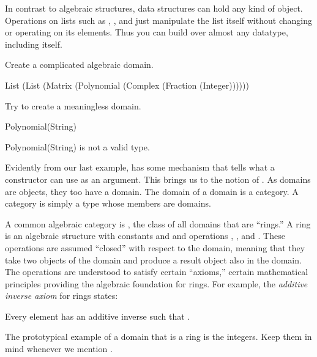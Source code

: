 In contrast to algebraic structures, data structures can hold any
kind of object.
Operations on lists such as ,
, and  just
manipulate the list itself without changing or operating on its
elements.
Thus you can build  over almost any datatype,
including itself.
\begin{xtc}
\begin{xtccomment}
Create a complicated algebraic domain.
\end{xtccomment}
\begin{spadsrc}
List (List (Matrix (Polynomial (Complex (Fraction (Integer))))))
\end{spadsrc}
\begin{TeXOutput}
\begin{fricasmath}{3}
%
\end{fricasmath}
\end{TeXOutput}
\end{xtc}
\begin{xtc}
\begin{xtccomment}
Try to create a meaningless domain.
\end{xtccomment}
\begin{spadsrc}
Polynomial(String)
\end{spadsrc}
\begin{MessageOutput}
   Polynomial(String) is not a valid type.
\end{MessageOutput}
\end{xtc}
Evidently from our last example, \Language{} has some mechanism
that tells what a constructor can use as an argument.
This brings us to the notion of .
As domains are objects, they too have a domain.
The domain of a domain is a category.
A category is simply a type whose members are domains.

A common algebraic category is , the class of all domains
that are ``rings.''
A ring is an algebraic structure with constants  and  and
operations , , and
.
These operations are assumed ``closed'' with respect to the domain,
meaning that they take two objects of the domain and produce a result
object also in the domain.
The operations are understood to satisfy certain ``axioms,'' certain
mathematical principles providing the algebraic foundation for rings.
For example, the {\it additive inverse axiom} for rings states:
\begin{center}
Every element  has an additive inverse  such
that .
\end{center}
The prototypical example of a domain that is a ring is the integers.
Keep them in mind whenever we mention .

